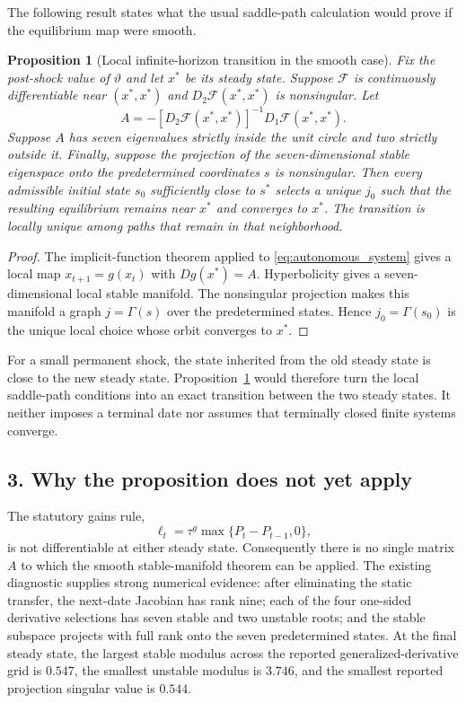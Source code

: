 \documentclass[11pt]{article}
\newtheorem{proposition}{Proposition}
\begin{document}
The following result states what the usual saddle-path calculation would prove
if the equilibrium map were smooth.

\begin{proposition}[Local infinite-horizon transition in the smooth case]
\label{prop:smooth_transition}
Fix the post-shock value of $\vartheta$ and let $x^*$ be its steady state.
Suppose $\mathcal F$ is continuously differentiable near $(x^*,x^*)$ and
$D_2\mathcal F(x^*,x^*)$ is nonsingular.  Let
\[
 A=-[D_2\mathcal F(x^*,x^*)]^{-1}D_1\mathcal F(x^*,x^*).
\]
Suppose $A$ has seven eigenvalues strictly inside the unit circle and two
strictly outside it.  Finally, suppose the projection of the seven-dimensional
stable eigenspace onto the predetermined coordinates $s$ is nonsingular.  Then
every admissible initial state $s_0$ sufficiently close to $s^*$ selects a unique
$j_0$ such that the resulting equilibrium remains near $x^*$ and converges to
$x^*$.  The transition is locally unique among paths that remain in that
neighborhood.
\end{proposition}

\begin{proof}
The implicit-function theorem applied to
\eqref{eq:autonomous_system} gives a local map $x_{t+1}=g(x_t)$ with
$Dg(x^*)=A$.  Hyperbolicity gives a seven-dimensional local stable manifold.
The nonsingular projection makes this manifold a graph $j=\Gamma(s)$ over the
predetermined states.  Hence $j_0=\Gamma(s_0)$ is the unique local choice whose
orbit converges to $x^*$.
\end{proof}

For a small permanent shock, the state inherited from the old steady state is
close to the new steady state.  Proposition~\ref{prop:smooth_transition} would
therefore turn the local saddle-path conditions into an exact transition
between the two steady states.  It neither imposes a terminal date nor assumes
that terminally closed finite systems converge.

\subsection*{3. Why the proposition does not yet apply}

The statutory gains rule,
\begin{equation}
 \ell_t=\tau^g\max\{P_t-P_{t-1},0\},
 \label{eq:kink}
\end{equation}
is not differentiable at either steady state.  Consequently there is no single
matrix $A$ to which the smooth stable-manifold theorem can be applied.  The
existing diagnostic supplies strong numerical evidence: after eliminating the
static transfer, the next-date Jacobian has rank nine; each of the four
one-sided derivative selections has seven stable and two unstable roots; and
the stable subspace projects with full rank onto the seven predetermined
states.  At the final steady state, the largest stable modulus across the
reported generalized-derivative grid is $0.547$, the smallest unstable modulus
is $3.746$, and the smallest reported projection singular value is $0.544$.
\end{document}
